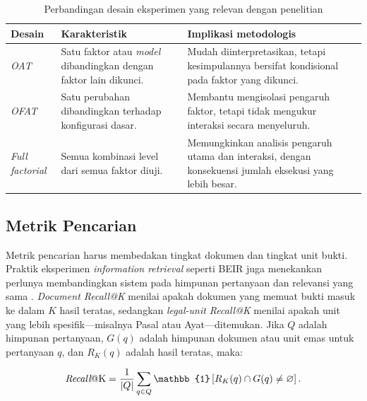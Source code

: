 \begin{table}[H]
    \centering
    \caption{Perbandingan desain eksperimen yang relevan dengan penelitian}
    \label{tab:ofat-full-factorial}
    \small
    \renewcommand{\arraystretch}{1.35}
    \begin{tabularx}{\textwidth}{>{\RaggedRight\arraybackslash}p{} >{\RaggedRight\arraybackslash}p{} >{\RaggedRight\arraybackslash}X}
        \toprule
        \textbf{Desain} & \textbf{Karakteristik} & \textbf{Implikasi metodologis} \\
        \midrule
        \emph{OAT} & Satu faktor atau \emph{model} dibandingkan dengan faktor lain dikunci. & Mudah diinterpretasikan, tetapi kesimpulannya bersifat kondisional pada faktor yang dikunci. \\
        \emph{OFAT} & Satu perubahan dibandingkan terhadap konfigurasi dasar. & Membantu mengisolasi pengaruh faktor, tetapi tidak mengukur interaksi secara menyeluruh. \\
        \emph{Full factorial} & Semua kombinasi level dari semua faktor diuji. & Memungkinkan analisis pengaruh utama dan interaksi, dengan konsekuensi jumlah eksekusi yang lebih besar. \\
        \bottomrule
    \end{tabularx}
\end{table}

\subsection{Metrik Pencarian}

Metrik pencarian harus membedakan tingkat dokumen dan tingkat unit bukti. Praktik eksperimen \emph{information retrieval} seperti BEIR juga menekankan perlunya membandingkan sistem pada himpunan pertanyaan dan relevansi yang sama \parencite{thakurBEIRHeterogeneousBenchmark2021}. \emph{Document Recall@K} menilai apakah dokumen yang memuat bukti masuk ke dalam $K$ hasil teratas, sedangkan \emph{legal-unit Recall@K} menilai apakah unit yang lebih spesifik—misalnya Pasal atau Ayat—ditemukan. Jika $Q$ adalah himpunan pertanyaan, $G(q)$ adalah himpunan dokumen atau unit emas untuk pertanyaan $q$, dan $R_K(q)$ adalah hasil teratas, maka:

\begin{equation}
    \operatorname{\emph{Recall}@K}=\frac{1}{|Q|}\sum_{q\in Q}
    \mathbb{1}\left[R_K(q)\cap G(q)\neq\varnothing\right].
\end{equation}

